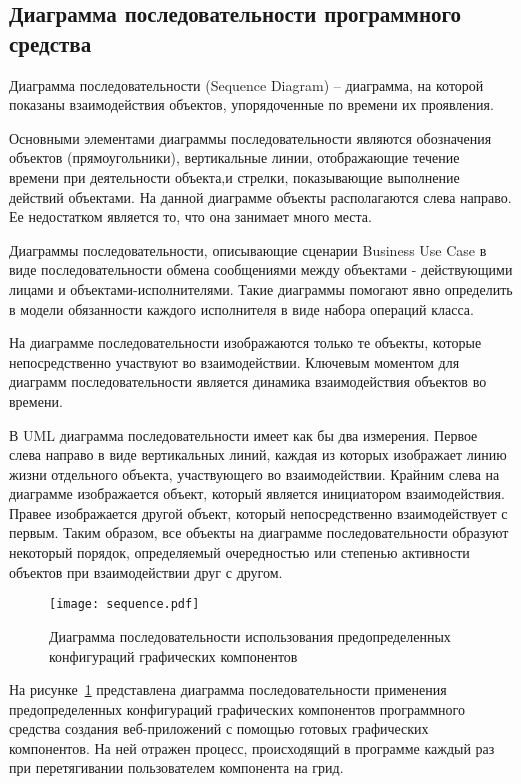 \subsection{Диаграмма последовательности программного средства}
\label{sec:modeling:sequence}

Диаграмма последовательности (Sequence Diagram) – диаграмма, на которой показаны взаимодействия объектов, упорядоченные по времени их проявления.

Основными элементами диаграммы последовательности являются обозначения объектов (прямоугольники), вертикальные линии, отображающие течение времени при деятельности объекта,и стрелки, показывающие выполнение действий объектами. На данной диаграмме объекты располагаются слева направо. Ее недостатком является то, что она занимает много места.

Диаграммы последовательности, описывающие сценарии Business Use Case в виде последовательности обмена сообщениями между объектами - действующими лицами и объектами-исполнителями. Такие диаграммы помогают явно определить в модели обязанности каждого исполнителя в виде набора операций класса.

На диаграмме последовательности изображаются только те объекты, которые непосредственно участвуют во взаимодействии. Ключевым моментом для диаграмм последовательности является динамика взаимодействия объектов во времени.

В UML диаграмма последовательности имеет как бы два измерения. Первое слева направо в виде вертикальных линий, каждая из которых изображает линию жизни отдельного объекта, участвующего во взаимодействии. Крайним слева на диаграмме изображается объект, который является инициатором взаимодействия. Правее изображается другой объект, который непосредственно взаимодействует с первым. Таким образом, все объекты на диаграмме последовательности образуют некоторый порядок, определяемый очередностью или степенью активности объектов при взаимодействии друг с другом.

\begin{figure}[ht]
\centering
    \texttt{[image: sequence.pdf]}
    \caption{Диаграмма последовательности использования предопределенных конфигураций графических компонентов}
    \label{sec:design:sequence_diagram}
\end{figure}

На рисунке~\ref{sec:design:sequence_diagram} представлена диаграмма последовательности применения предопределенных конфигураций графических компонентов программного средства создания веб-приложений с помощью готовых графических компонентов. 
На ней отражен процесс, происходящий в программе каждый раз при перетягивании пользователем компонента на грид.\pagebreak

